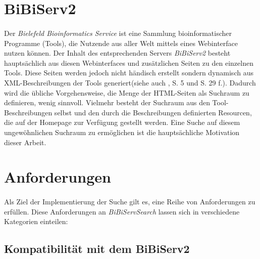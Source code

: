 \section{BiBiServ2}

\paragraph{} Der \textit{Bielefeld Bioinformatics Service} ist eine Sammlung bioinformatischer Programme (Tools), die Nutzende aus aller Welt mittels eines Webinterface nutzen können. Der Inhalt des entsprechenden Servers \textit{BiBiServ2} besteht hauptsächlich aus diesen Webinterfaces und zusätzlichen Seiten zu den einzelnen Tools. Diese Seiten werden jedoch nicht händisch erstellt sondern dynamisch aus XML-Beschreibungen der Tools generiert(siehe auch \cite{hagemeier}, S. 5 und S. 29 f.). Dadurch wird die übliche Vorgehensweise, die Menge der HTML-Seiten als Suchraum zu definieren, wenig sinnvoll. Vielmehr besteht der Suchraum aus den Tool-Beschreibungen selbst und den durch die Beschreibungen definierten Resourcen, die auf der Homepage zur Verfügung gestellt werden. Eine Suche auf diesem ungewöhnlichen Suchraum zu ermöglichen ist die hauptsächliche Motivation dieser Arbeit.

\section{Anforderungen}
\label{anforderungen}

\paragraph{} Als Ziel der Implementierung der Suche gilt es, eine Reihe von Anforderungen zu erfüllen. Diese Anforderungen an \textit{BiBiServSearch} lassen sich in verschiedene Kategorien einteilen:

\subsection{Kompatibilität mit dem BiBiServ2}
\label{intro-compatibility}

